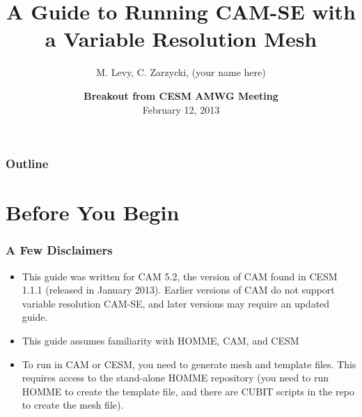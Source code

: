 \documentclass{beamer}
\title[{\color{white}Variable Resolution CAM-SE}]{A Guide to Running CAM-SE with a Variable Resolution Mesh}
\author[M. Levy]{M. Levy, C. Zarzycki, (your name here)}
\institute[mlevy@ucar.edu]{}
\date[February 12, 2013]{{\bf Breakout from CESM AMWG Meeting}\\February 12, 2013}
\begin{document}
%
\begin{frame}
\maketitle
\end{frame}
%
\begin{frame}
\frametitle{Outline}
\begin{block}{}
\tableofcontents
\end{block}
\end{frame}
%
\section{Before You Begin}
\begin{frame}
\frametitle{A Few Disclaimers}
\begin{block}{}
\begin{itemize}
\item This guide was written for CAM 5.2, the version of CAM found in CESM 1.1.1 (released in January 2013). Earlier versions of CAM do not support variable resolution CAM-SE, and later versions may require an updated guide.
\item This guide assumes familiarity with HOMME, CAM, and CESM
\item To run in CAM or CESM, you need to generate mesh and template files. This requires access to the stand-alone HOMME repository (you need to run HOMME to create the template file, and there are CUBIT scripts in the repo to create the mesh file).
\end{itemize}
\end{block}
\end{frame}
\end{document}
